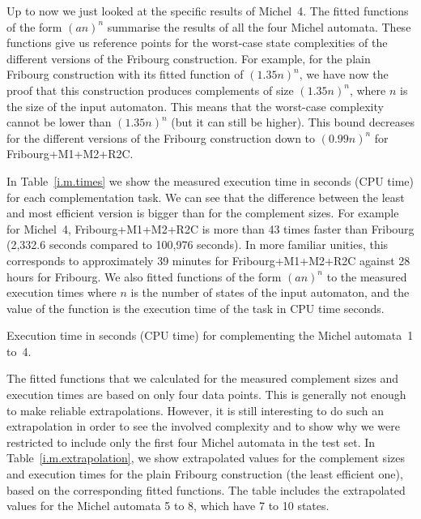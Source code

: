 Up to now we just looked at the specific results of Michel~4. The fitted functions of the form $(an)^n$ summarise the results of all the four Michel automata. These functions give us reference points for the worst-case state complexities of the different versions of the Fribourg construction. For example, for the plain Fribourg construction with its fitted function of $(1.35n)^n$, we have now the proof that this construction produces complements of size $(1.35n)^n$, where $n$ is the size of the input automaton. This means that the worst-case complexity cannot be lower than $(1.35n)^n$ (but it can still be higher). This bound decreases for the different versions of the Fribourg construction down to $(0.99n)^n$ for Fribourg+M1+M2+R2C.

In Table~\ref{i.m.times} we show the measured execution time in seconds (CPU time) for each complementation task. We can see that the difference between the least and most efficient version is bigger than for the complement sizes. For example for Michel~4, Fribourg+M1+M2+R2C is more than 43 times faster than Fribourg (2,332.6 seconds compared to 100,976 seconds). In more familiar unities, this corresponds to approximately 39 minutes for Fribourg+M1+M2+R2C against 28 hours for Fribourg. We also fitted functions of the form $(an)^n$ to the measured execution times where $n$ is the number of states of the input automaton, and the value of the function is the execution time of the task in CPU time seconds.

\begin{table}[htb!]
\centering

\caption{Execution time in seconds (CPU time) for complementing the Michel automata~1 to~4.}
\label{i.m.times}
\end{table}

The fitted functions that we calculated for the measured complement sizes and execution times are based on only four data points. This is generally not enough to make reliable extrapolations. However, it is still interesting to do such an extrapolation in order to see the involved complexity and to show why we were restricted to include only the first four Michel automata in the test set. In Table~\ref{i.m.extrapolation}, we show extrapolated values for the complement sizes and execution times for the plain Fribourg construction (the least efficient one), based on the corresponding fitted functions. The table includes the extrapolated values for the Michel automata 5 to 8, which have 7 to 10 states. 


